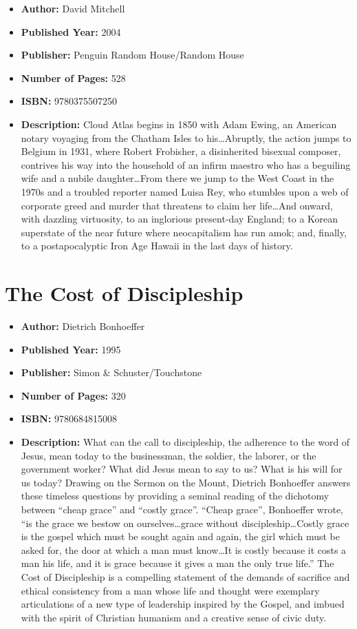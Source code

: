 \documentclass{tufte-handout}
\begin{document}
\begin{itemize}
    \item[] \textbf{Author:} David Mitchell
    \item[] \textbf{Published Year:} 2004  
    \item[] \textbf{Publisher:} Penguin Random House/Random House
    \item[] \textbf{Number of Pages:} 528      
    \item[] \textbf{ISBN:} 9780375507250
    \item[] \textbf{Description:} Cloud Atlas begins in 1850 with Adam Ewing, an American notary voyaging from the Chatham Isles to his\ldots  Abruptly, the action jumps to Belgium in 1931, where Robert Frobisher, a disinherited bisexual composer, contrives his way into the household of an infirm maestro who has a beguiling wife and a nubile daughter\ldots From there we jump to the West Coast in the 1970s and a troubled reporter named Luisa Rey, who stumbles upon a web of corporate greed and murder that threatens to claim her life\ldots And onward, with dazzling virtuosity, to an inglorious present-day England; to a Korean superstate of the near future where neocapitalism has run amok; and, finally, to a postapocalyptic Iron Age Hawaii in the last days of history.
\end{itemize}

\section*{The Cost of Discipleship}

\begin{itemize}
    \item[] \textbf{Author:} Dietrich Bonhoeffer
    \item[] \textbf{Published Year:} 1995  
    \item[] \textbf{Publisher:} Simon \& Schuster/Touchstone
    \item[] \textbf{Number of Pages:} 320      
    \item[] \textbf{ISBN:} 9780684815008
    \item[] \textbf{Description:} What can the call to discipleship, the adherence to the word of Jesus, mean today to the businessman, the soldier, the laborer, or the government worker? What did Jesus mean to say to us? What is his will for us today? Drawing on the Sermon on the Mount, Dietrich Bonhoeffer answers these timeless questions by providing a seminal reading of the dichotomy between ``cheap grace'' and ``costly grace''. ``Cheap grace'', Bonhoeffer wrote, ``is the grace we bestow on ourselves\ldots grace without discipleship\ldots Costly grace is the gospel which must be sought again and again, the girl which must be asked for, the door at which a man must know\ldots It is costly because it costs a man his life, and it is grace because it gives a man the only true life.'' The Cost of Discipleship is a compelling statement of the demands of sacrifice and ethical consistency from a man whose life and thought were exemplary articulations of a new type of leadership inspired by the Gospel, and imbued with the spirit of Christian humanism and a creative sense of civic duty.
\end{itemize}
\end{document}
